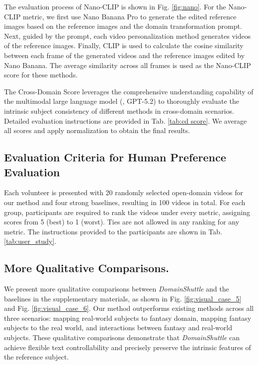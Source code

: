 The evaluation process of Nano-CLIP is shown in Fig. \ref{fig:nano}. For the Nano-CLIP metric, we first use Nano Banana Pro \cite{nano_banana} to generate the edited reference images based on the reference images and the domain transformation prompt. Next, guided by the prompt, each video personalization method generates videos of the reference images. Finally, CLIP is used to calculate the cosine similarity between each frame of the generated videos and the reference images edited by Nano Banana. The average similarity across all frames is used as the Nano-CLIP score for these methods.

The Cross-Domain Score leverages the comprehensive understanding capability of the multimodal large language model (\ie, GPT-5.2) to thoroughly evaluate the intrinsic subject consistency of different methods in cross-domain scenarios. Detailed evaluation instructions are provided in Tab. \ref{tab:cd score}. We average all scores and apply normalization to obtain the final results.




\subsection{Evaluation Criteria for Human Preference Evaluation}



Each volunteer is presented with 20 randomly selected open-domain videos for our method and four strong baselines, resulting in 100 videos in total. For each group, participants are required to rank the videos under every metric, assigning scores from 5 (best) to 1 (worst). Ties are not allowed in any ranking for any metric. The instructions provided to the participants are shown in Tab. \ref{tab:user_study}.



\subsection{More Qualitative Comparisons.}

We present more qualitative comparisons between \textit{DomainShuttle} and the baselines in the supplementary materials, as shown in Fig. \ref{fig:visual_case_5} and  Fig. \ref{fig:visual_case_6}. Our method outperforms existing methods across all three scenarios: mapping real-world subjects to fantasy domain, mapping fantasy subjects to the real world, and interactions between fantasy and real-world subjects. These qualitative comparisons demonstrate that \textit{DomainShuttle}  can achieve flexible text controllability and precisely preserve the intrinsic features of the reference subject.

